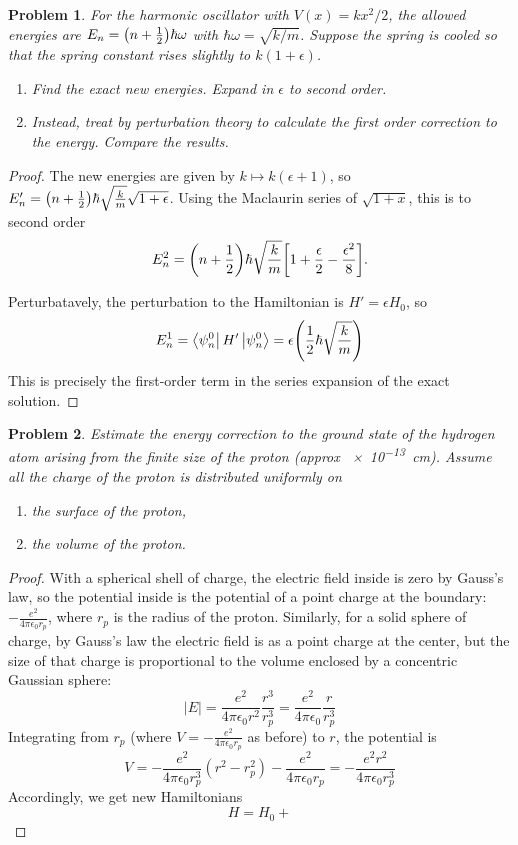 \documentclass{article}
\newtheorem{plm}{Problem}
\begin{document}
\begin{plm}
  For the harmonic oscillator with $V(x) = kx^{2}/2$, the allowed energies are $E_{n} = \qty(n + \frac{1}{2})\hbar\omega$
  with $\hbar\omega = \sqrt{k / m}$.
  Suppose the spring is cooled so that the spring constant rises slightly to $k(1 + \epsilon)$.
  \begin{enumerate}
  \item Find the exact new energies.
    Expand in $\epsilon$ to second order.
  \item Instead, treat by perturbation theory to calculate the first order correction to the energy.
    Compare the results.
  \end{enumerate}
\end{plm}

\begin{proof}
  The new energies are given by $k \mapsto k(\epsilon + 1)$, so $E_{n}' = \qty(n + \frac{1}{2})\hbar\sqrt{\frac{k}{m}}\sqrt{1 + \epsilon}$.
  Using the Maclaurin series of $\sqrt{1 + x}$, this is to second order
  \[
    E_{n}^{2} = \qty(n + \frac{1}{2})\hbar\sqrt{\frac{k}{m}}\qty[1 + \frac{\epsilon}{2} - \frac{\epsilon^{2}}{8}].
  \]

  Perturbatavely, the perturbation to the Hamiltonian is $H' = \epsilon H_{0}$, so
  \[
    E_{n}^{1} = \bra{\psi_{n}^{0}} H' \ket{\psi_{n}^{0}} = \epsilon\qty(\frac{1}{2}\hbar\sqrt{\frac{k}{m}})
  \]
  This is precisely the first-order term in the series expansion of the exact solution.
\end{proof}

\begin{plm}
  Estimate the energy correction to the ground state of the hydrogen atom arising from the finite size of the proton (approx \SI{e-13}{cm}).
  Assume all the charge of the proton is distributed uniformly on
  \begin{enumerate}
  \item the surface of the proton,
  \item the volume of the proton.
  \end{enumerate}
\end{plm}

\begin{proof}
  With a spherical shell of charge, the electric field inside is zero by Gauss's law,
  so the potential inside is the potential of a point charge at the boundary: $-\frac{e^{2}}{4\pi \epsilon_{0}r_{p}}$,
  where $r_{p}$ is the radius of the proton.
  Similarly, for a solid sphere of charge, by Gauss's law the electric field is as a point charge at the center,
  but the size of that charge is proportional to the volume enclosed by a concentric Gaussian sphere:
  \[
    |E| = \frac{e^{2}}{4\pi\epsilon_{0}r^{2}}\frac{r^{3}}{r_{p}^{3}} = \frac{e^{2}}{4\pi\epsilon_{0}}\frac{r}{r_{p}^{3}}
  \]
  Integrating from $r_{p}$ (where $V = -\frac{e^{2}}{4\pi\epsilon_{0}r_{p}}$ as before) to $r$, the potential is
  \[
    V = -\frac{e^{2}}{4\pi\epsilon_{0}r_{p}^{3}}(r^{2} - r_{p}^{2}) - \frac{e^{2}}{4\pi\epsilon_{0}r_{p}}
    = -\frac{e^{2}r^{2}}{4\pi\epsilon_{0}r_{p}^{3}}
  \]
  Accordingly, we get new Hamiltonians
  \[
    H = H_{0} +
  \]
\end{proof}
\end{document}
